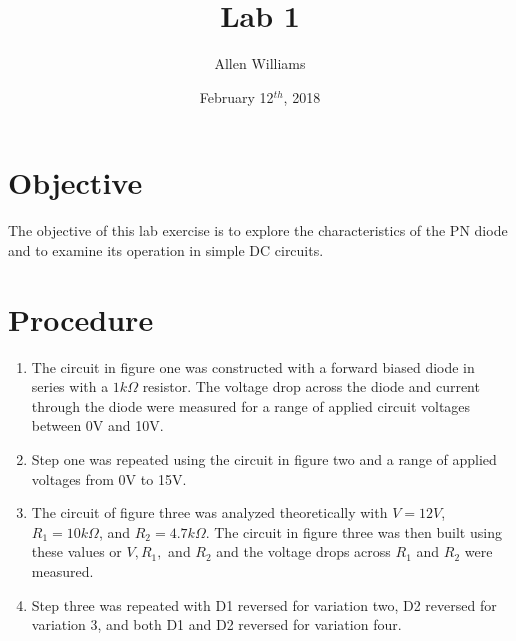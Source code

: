 \documentclass{article}
\title{Lab 1}
\author{Allen Williams}
\date{February 12$^{th}$, 2018}
\begin{document}
\maketitle

\section*{Objective}
The objective of this lab exercise is to explore the characteristics of the PN diode and to examine its operation in simple DC circuits.
\section*{Procedure}
\begin{enumerate}
    \item The circuit in figure one was constructed with a forward biased diode in series with a $1k\Omega$ resistor.  The voltage drop across the diode and current through the diode were measured for a range of applied circuit voltages between 0V and 10V.
    \item Step one was repeated using the circuit in figure two and a range of applied voltages from 0V to 15V.
    \item The circuit of figure three was analyzed theoretically with $V=12V$, $R_1=10k\Omega$, and $R_2=4.7k\Omega$.  The circuit in figure three was then built using these values or $V,R_1,$ and $R_2$ and the voltage drops across $R_1$ and $R_2$ were measured.
    \item Step three was repeated with D1 reversed for variation two, D2 reversed for variation 3, and both D1 and D2 reversed for variation four.
\end{enumerate}
\end{document}
